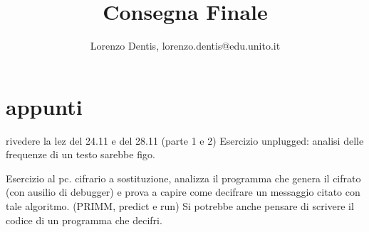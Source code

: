 \documentclass[a4paper]{article}
\begin{document}
\author{Lorenzo Dentis, lorenzo.dentis@edu.unito.it}
\title{Consegna Finale}
\maketitle
\section{appunti}
rivedere la lez del 24.11 e del 28.11 (parte 1 e 2)
Esercizio unplugged: analisi delle frequenze di un testo sarebbe figo.

Esercizio al pc. cifrario a sostituzione, analizza il programma che genera il cifrato (con ausilio di debugger) e prova a capire come decifrare un messaggio citato con tale algoritmo. (PRIMM, predict e run)
Si potrebbe anche pensare di scrivere il codice di un programma che decifri. 
\end{document}
